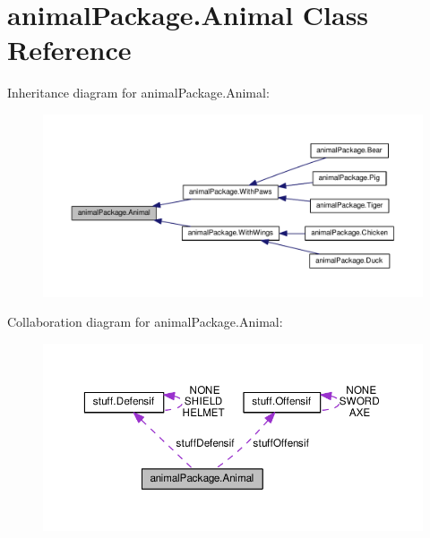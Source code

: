 \hypertarget{classanimal_package_1_1_animal}{}\section{animal\+Package.\+Animal Class Reference}
\label{classanimal_package_1_1_animal}


Inheritance diagram for animal\+Package.\+Animal\+:\nopagebreak
\begin{figure}[H]
\begin{center}
\leavevmode
\includegraphics[width=350pt]{classanimal_package_1_1_animal__inherit__graph}
\end{center}
\end{figure}


Collaboration diagram for animal\+Package.\+Animal\+:\nopagebreak
\begin{figure}[H]
\begin{center}
\leavevmode
\includegraphics[width=350pt]{classanimal_package_1_1_animal__coll__graph}
\end{center}
\end{figure}
